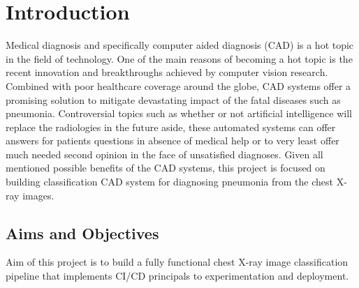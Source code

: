 \chapter{Introduction} \label{chap:introduction}

Medical diagnosis and specifically computer aided diagnosis (CAD) is a hot topic in the field of technology. One of the main reasons of becoming a hot topic is the recent innovation and breakthroughs achieved by computer vision research. Combined with poor healthcare coverage around the globe, CAD systems  offer a promising solution to mitigate devastating impact of the fatal diseases such as pneumonia. Controversial topics such as whether or not artificial intelligence will replace the radiologies in the future aside, these automated systems can offer answers for patients questions in absence of medical help or to very least offer much needed second opinion in the face of unsatisfied diagnoses. Given all mentioned possible benefits of the CAD systems, this project is focused on building classification CAD system for diagnosing pneumonia from the chest X-ray images.

\section{Aims and Objectives} \label{sec:aimsandobj}
Aim of this project is to build a fully functional chest X-ray image classification pipeline that implements CI/CD principals to experimentation and deployment.

